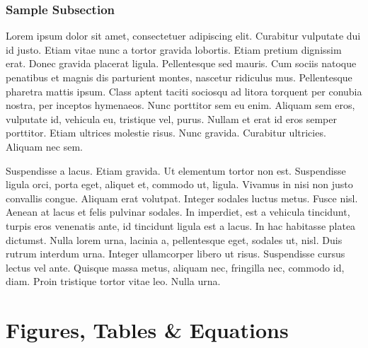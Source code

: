 \documentclass[nobinding]{sydeStyle}	%
\begin{document}
	\subsection{Sample Subsection}
Lorem ipsum dolor sit amet, consectetuer adipiscing elit. Curabitur vulputate dui id justo. Etiam vitae nunc a tortor gravida lobortis. Etiam pretium dignissim erat. Donec gravida placerat ligula. Pellentesque sed mauris. Cum sociis natoque penatibus et magnis dis parturient montes, nascetur ridiculus mus. Pellentesque pharetra mattis ipsum. Class aptent taciti sociosqu ad litora torquent per conubia nostra, per inceptos hymenaeos. Nunc porttitor sem eu enim. Aliquam sem eros, vulputate id, vehicula eu, tristique vel, purus. Nullam et erat id eros semper porttitor. Etiam ultrices molestie risus. Nunc gravida. Curabitur ultricies. Aliquam nec sem.

Suspendisse a lacus. Etiam gravida. Ut elementum tortor non est. Suspendisse ligula orci, porta eget, aliquet et, commodo ut, ligula. Vivamus in nisi non justo convallis congue. Aliquam erat volutpat. Integer sodales luctus metus. Fusce nisl. Aenean at lacus et felis pulvinar sodales. In imperdiet, est a vehicula tincidunt, turpis eros venenatis ante, id tincidunt ligula est a lacus. In hac habitasse platea dictumst. Nulla lorem urna, lacinia a, pellentesque eget, sodales ut, nisl. Duis rutrum interdum urna. Integer ullamcorper libero ut risus. Suspendisse cursus lectus vel ante. Quisque massa metus, aliquam nec, fringilla nec, commodo id, diam. Proin tristique tortor vitae leo. Nulla urna.

\chapter{Figures, Tables \& Equations}
\end{document}
